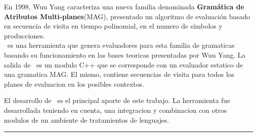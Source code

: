 \documentclass[a4paper,12pt,twoside]{ThesisStyle}
\begin{document}
\begin{vcenterpage}
En 1998, Wuu Yang caracteriza una nueva familia denominada \textbf{Gramática de Atributos Multi-planes}(MAG), presentado un algoritmo de evaluación basado en secuencia de visita en tiempo polinomial, en el numero de símbolos y producciones.\\ 

\maggen\ es una herramienta que genera evaluadores para esta familia de gramaticas basando su funcionamiento en las bases teoricas presentadas por Wuu Yang. La salida de \maggen\ es un modulo C++ que se corresponde con un evaluador estatico de una gramatica MAG. El mismo, contiene secuencias de visita para todos los planes de evaluacion en los posibles contextos.

El desarrollo de \maggen\ es el principal aporte de este trabajo. La herramienta fue desarrollada teniendo en cuenta, una integracion y combinacion con otros modulos de un ambiente de tratamientos de lenguajes.



% 

\noindent\rule[2pt]{\textwidth}{0.5pt}

\end{vcenterpage}



\tableofcontents

\mainmatter

% 
\appendix



% 
% 



\end{document}
